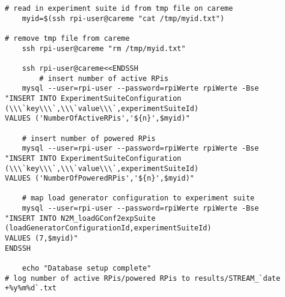 \begin{verbatim}
# read in experiment suite id from tmp file on careme                                                                                                                       
	myid=$(ssh rpi-user@careme "cat /tmp/myid.txt")

# remove tmp file from careme                                                                                                                                                                                                                                                                                                                          
	ssh rpi-user@careme "rm /tmp/myid.txt"
    
	ssh rpi-user@careme<<ENDSSH                                                                                                                                                
        # insert number of active RPis
    mysql --user=rpi-user --password=rpiWerte rpiWerte -Bse 
"INSERT INTO ExperimentSuiteConfiguration (\\\`key\\\`,\\\`value\\\`,experimentSuiteId) 
VALUES ('NumberOfActiveRPis','${n}',$myid)"                                                                                                                                                           

    # insert number of powered RPis                                 
    mysql --user=rpi-user --password=rpiWerte rpiWerte -Bse 
"INSERT INTO ExperimentSuiteConfiguration (\\\`key\\\`,\\\`value\\\`,experimentSuiteId) 
VALUES ('NumberOfPoweredRPis','${n}',$myid)"                                                                                                                                                            

    # map load generator configuration to experiment suite                                                                                                                     
    mysql --user=rpi-user --password=rpiWerte rpiWerte -Bse 
"INSERT INTO N2M_loadGConf2expSuite (loadGeneratorConfigurationId,experimentSuiteId) 
VALUES (7,$myid)"             
ENDSSH

	echo "Database setup complete"
# log number of active RPis/powered RPis to results/STREAM_`date +%y%m%d`.txt 


\end{verbatim}
